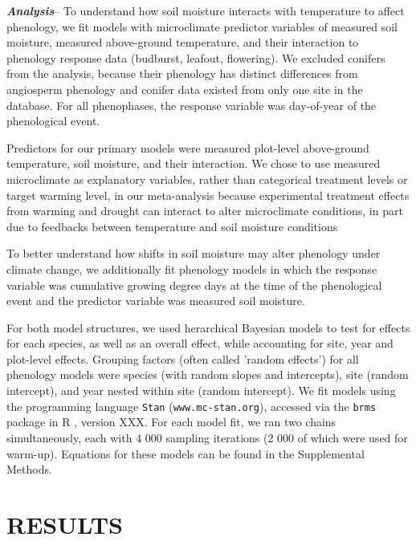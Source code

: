 \documentclass{article}
\begin{document}
\par\textbf {\emph{Analysis}}--
To understand how soil moisture interacts with temperature to affect phenology, we fit models with microclimate predictor variables of measured soil moisture, measured above-ground temperature, and their interaction to phenology response data (budburst, leafout, flowering). We excluded conifers from the analysis, because their phenology has distinct differences from angiosperm phenology \cite{polgar2014} and conifer data existed from only one site in the database. For all phenophases, the response variable was day-of-year of the phenological event. 
\par Predictors for our primary models were measured plot-level above-ground temperature, soil moisture, and their interaction. We chose to use measured microclimate as explanatory variables, rather than categorical treatment levels or target warming level, in our meta-analysis because experimental treatment effects from warming and drought can interact to alter microclimate conditions, in part due to feedbacks between temperature and soil moisture conditions \citep{ettinger2019,mcdaniel2014}

\par To better understand how shifts in soil moisture may alter phenology under climate change, we additionally fit phenology models in which the response variable was cumulative growing degree days at the time of the phenological event and the predictor variable was measured soil moisture. 

\par For both model structures, we used herarchical Bayesian models to test for effects for each species, as well as an overall effect, while accounting for site, year and plot-level effects. Grouping factors (often called 'random effects') for all phenology models were species (with random slopes and intercepts), site (random intercept), and year nested within site (random intercept). We fit models using the programming language \texttt{Stan} \citep{Carpenter:2016aa} (\texttt{www.mc-stan.org}), accessed via the \texttt{brms}\citep{burkner2021} package in R \citep{rcoreteam2022}, version XXX. For each model fit, we ran two chains simultaneously, each with 4 000 sampling iterations (2 000 of which were used for warm-up). Equations for these models can be found in the Supplemental Methods. 

\section* {RESULTS}
\end{document}
